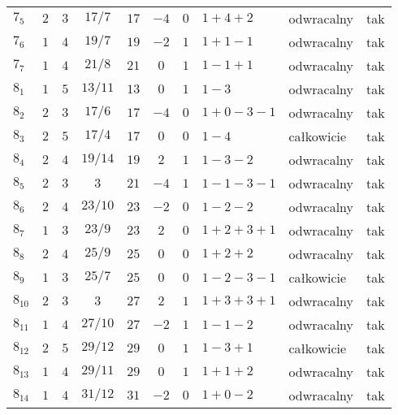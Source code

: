 \begin{longtable}{lccccccllc}
$7_{5}$     &  $2$     &  $3$  &  $17/7$   &  $17$   &  $-4$  &  $0$  &  $1+4+2$        &  odwracalny  &  tak  \\
$7_{6}$     &  $1$     &  $4$  &  $19/7$   &  $19$   &  $-2$  &  $1$  &  $1+1-1$        &  odwracalny  &  tak  \\
$7_{7}$     &  $1$     &  $4$  &  $21/8$   &  $21$   &  $0$   &  $1$  &  $1-1+1$        &  odwracalny  &  tak  \\
$8_{1}$     &  $1$     &  $5$  &  $13/11$  &  $13$   &  $0$   &  $1$  &  $1-3$          &  odwracalny  &  tak  \\
$8_{2}$     &  $2$     &  $3$  &  $17/6$   &  $17$   &  $-4$  &  $0$  &  $1+0-3-1$      &  odwracalny  &  tak  \\
$8_{3}$     &  $2$     &  $5$  &  $17/4$   &  $17$   &  $0$   &  $0$  &  $1-4$          &  całkowicie  &  tak  \\
$8_{4}$     &  $2$     &  $4$  &  $19/14$  &  $19$   &  $2$   &  $1$  &  $1-3-2$        &  odwracalny  &  tak  \\
$8_{5}$     &  $2$     &  $3$  &  $3$      &  $21$   &  $-4$  &  $1$  &  $1-1-3-1$      &  odwracalny  &  tak  \\
$8_{6}$     &  $2$     &  $4$  &  $23/10$  &  $23$   &  $-2$  &  $0$  &  $1-2-2$        &  odwracalny  &  tak  \\
$8_{7}$     &  $1$     &  $3$  &  $23/9$   &  $23$   &  $2$   &  $0$  &  $1+2+3+1$      &  odwracalny  &  tak  \\
$8_{8}$     &  $2$     &  $4$  &  $25/9$   &  $25$   &  $0$   &  $0$  &  $1+2+2$        &  odwracalny  &  tak  \\
$8_{9}$     &  $1$     &  $3$  &  $25/7$   &  $25$   &  $0$   &  $0$  &  $1-2-3-1$      &  całkowicie  &  tak  \\
$8_{10}$    &  $2$     &  $3$  &  $3$      &  $27$   &  $2$   &  $1$  &  $1+3+3+1$      &  odwracalny  &  tak  \\
$8_{11}$    &  $1$     &  $4$  &  $27/10$  &  $27$   &  $-2$  &  $1$  &  $1-1-2$        &  odwracalny  &  tak  \\
$8_{12}$    &  $2$     &  $5$  &  $29/12$  &  $29$   &  $0$   &  $1$  &  $1-3+1$        &  całkowicie  &  tak  \\
$8_{13}$    &  $1$     &  $4$  &  $29/11$  &  $29$   &  $0$   &  $1$  &  $1+1+2$        &  odwracalny  &  tak  \\
$8_{14}$    &  $1$     &  $4$  &  $31/12$  &  $31$   &  $-2$  &  $0$  &  $1+0-2$        &  odwracalny  &  tak  \\

\end{longtable}
